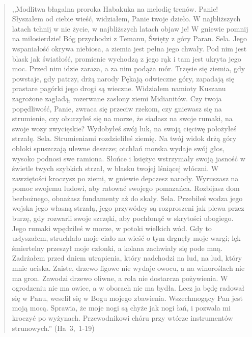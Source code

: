 \documentclass[10pt,a4paper,oneside]{article}
\begin{document}
\paragraph{}
\begin{quote}
,,Modlitwa błagalna proroka Habakuka na melodię trenów. Panie! Słyszałem od ciebie wieść, widziałem, Panie twoje dzieło. W najbliższych latach tchnij w nie życie, w najbliższych latach objaw je! W gniewie pomnij na miłosierdzie! Bóg przychodzi z Temanu, Święty z góry Paran. Sela. Jego wspaniałość okrywa niebiosa, a ziemia jest pełna jego chwały. Pod nim jest blask jak światłość, promienie wychodzą z jego rąk i tam jest ukryta jego moc. Przed nim idzie zaraza, a za nim podąża mór. Trzęsie się ziemia, gdy powstaje, gdy patrzy, drżą narody Pękają odwieczne góry, zapadają się prastare pagórki jego drogi są wieczne. Widziałem namioty Kuszanu zagrożone zagładą, rozerwane zasłony ziemi Midianitów. Czy twoja popędliwość, Panie, zwraca się przeciw rzekom, czy gniewasz się na strumienie, czy oburzyłeś się na morze, że siadasz na swoje rumaki, na swoje wozy zwycięskie? Wydobyłeś swój łuk, na swoją cięciwę położyłeś strzałę. Sela. Strumieniami rozdzieliłeś ziemię. Na twój widok drżą góry obłoki spuszczają ulewne deszcze; otchłań morska wydaje swój głos, wysoko podnosi swe ramiona. Słońce i księżyc wstrzymały swoją jasność w świetle twych szybkich strzał, w blasku twojej lśniącej włóczni. W zawziętości kroczysz po ziemi, w gniewie depczesz narody. Wyruszasz na pomoc swojemu ludowi, aby ratować swojego pomazańca. Rozbijasz dom bezbożnego, obnażasz fundamenty aż do skały. Sela. Przebiłeś wodza jego wojska jego własną strzałą, jego przywódcy są rozproszeni jak plewa przez burzę, gdy rozwarli swoje szczęki, aby pochłonąć w skrytości ubogiego. Jego rumaki wpędziłeś w morze, w potoki wielkich wód. Gdy to usłyszałem, struchlało moje ciało na wieść o tym drgnęły moje wargi; lęk śmiertelny przeszył moje członki, a kolana zachwiały się pode mną. Zadrżałem przed dniem utrapienia, który nadchodzi na lud, na lud, który mnie uciska. Zaiste, drzewo figowe nie wydaje owocu, a na winoroślach nie ma gron. Zawodzi drzewo oliwne, a rola nie dostarcza pożywienia. W ogrodzeniu nie ma owiec, a w oborach nie ma bydła. Lecz ja będę radował się w Panu, weselił się w Bogu mojego zbawienia. Wszechmogący Pan jest moją mocą. Sprawia, że moje nogi są chyże jak nogi łań, i pozwala mi kroczyć po wyżynach. Przewodnikowi chóru przy wtórze instrumentów strunowych.'' \mbox{(Ha 3, 1-19)}
\end{quote}
\end{document}
